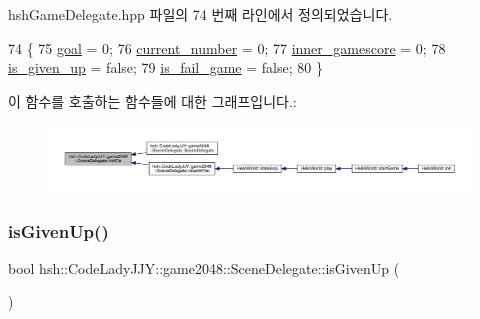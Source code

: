 hsh\+Game\+Delegate.\+hpp 파일의 74 번째 라인에서 정의되었습니다.


\begin{DoxyCode}
74                               \{
75                     \hyperlink{classhsh_1_1_code_lady_j_j_y_1_1game2048_1_1_scene_delegate_a837886106e5ac017e4f57d8f56943e20}{goal} = 0;
76                     \hyperlink{classhsh_1_1_code_lady_j_j_y_1_1game2048_1_1_scene_delegate_af013ba6abf67944a36a117be7c97f0d3}{current\_number} = 0;
77                     \hyperlink{classhsh_1_1_code_lady_j_j_y_1_1game2048_1_1_scene_delegate_af8e4687385133b732cc12f92d4118862}{inner\_gamescore} = 0;
78                     \hyperlink{classhsh_1_1_code_lady_j_j_y_1_1game2048_1_1_scene_delegate_a8ea6710e5c00d1af16c4566260c62501}{is\_given\_up} = \textcolor{keyword}{false};
79                     \hyperlink{classhsh_1_1_code_lady_j_j_y_1_1game2048_1_1_scene_delegate_a73d468ae6105f774847049e83ea5cc61}{is\_fail\_game} = \textcolor{keyword}{false};
80                 \}
\end{DoxyCode}
이 함수를 호출하는 함수들에 대한 그래프입니다.\+:
\nopagebreak
\begin{figure}[H]
\begin{center}
\leavevmode
\includegraphics[width=350pt]{d7/d4d/classhsh_1_1_code_lady_j_j_y_1_1game2048_1_1_scene_delegate_ab5504cff24fa2c916c0c6139aff67a4e_icgraph}
\end{center}
\end{figure}
\mbox{\label{classhsh_1_1_code_lady_j_j_y_1_1game2048_1_1_scene_delegate_a66c164970bd5d826ca85deaeea30167b}} 
\subsubsection{\texorpdfstring{is\+Given\+Up()}{isGivenUp()}}
{\footnotesize\ttfamily bool hsh\+::\+Code\+Lady\+J\+J\+Y\+::game2048\+::\+Scene\+Delegate\+::is\+Given\+Up (\begin{DoxyParamCaption}{ }\end{DoxyParamCaption})\hspace{0.3cm}{\ttfamily [inline]}}



